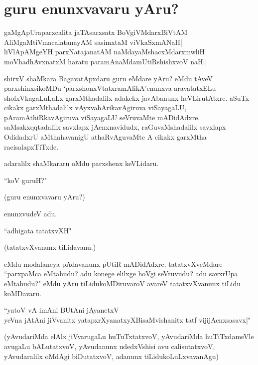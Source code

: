 \chapter{guru enunxvavaru yAru?}\label{chap12}

\begin{shloka}
gaMgApUraparxcalita jaTAsarxsatx BoVgiVMdarxBiVtAM\\
AliMgaMtiVmacalatanayAM sasimxtaM viVkaSxmANaH|\\
liVlApAMgeYH parxNatajanatAM naMdayaMshacxMdarxmwliH\\
moVhadhAvxnatxM haratu paramAnaMdamUtiRshishxvoV naH||
\end{shloka}

shirxV shaMkara BagavatApxdaru guru eMdare yAru? eMdu tAveV parxshinxsikoMDu `parxshonxVtatxramAlikA'enunxva aravatatxELu sholxVkagaLuLaLx garxMthadalilx adakekx javAbanunx heVLirutAtxre. aSuTx cikakx garxMthadalilx vAyxvahArikavAgiruva viSayagaLU, pAramAthiRkavAgiruva viSayagaLU seVruvaMte mADidAdxre. saMsakxqqtadalilx savxlapx jAcnxnavidudx, raGuvaMshadalilx savxlapx OdidadxrU aMthahavanigU athaRvAguvaMte A cikakx garxMtha racisalapxTiTxde. 

adaralilx shaMkararu oMdu parxshenx keVLidaru.

\begin{shloka}
``koV guruH?"
\end{shloka}

(guru enunxvavaru yAru?)

enunxvudeV adu. 

\begin{shloka}
``adhigata tatatxvXH"
\end{shloka}

(tatatxvXvanunx tiLidavanu.)

eMdu modalaneya pAdavanunx pUtiR mADidAdxre. tatatxvXveMdare ``parxpaMca eMtahudu? adu konege elilxge hoVgi seVruvudu? adu savxrUpa eMtahudu?" eMdu yAru tiLidukoMDiruvaroV avareV tatatxvXvanunx tiLidu koMDavaru. 

\begin{shloka}
``yatoV vA imAni BUtAni jAyanetxV\\
yeVna jAtAni jiVvanitx yatapxrXyanatxyXBisaMvishanitx tatf vijijAcnxsasavx|"
\end{shloka}

(yAvudariMda elAlx jiVvarugaLu huTuTxtatxvoV, yAvudariMda huTiTxdameVle avugaLu bALutatxvoV, yAvudanunx udedxVshisi avu calisutatxvoV, yAvudaralilx oMdAgi biDutatxvoV, adanunx tiLidukoLuLxvavanAgu)

